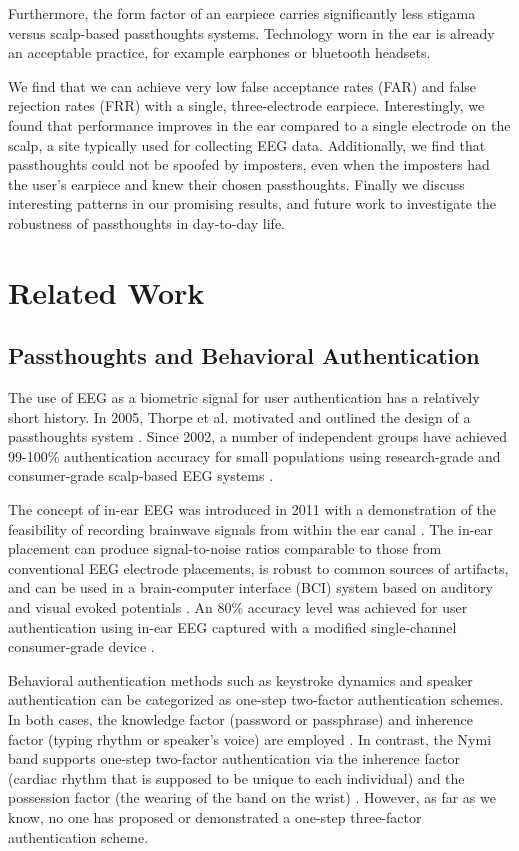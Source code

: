 \documentclass{sigchi}
\begin{document}
Furthermore, the form factor of an earpiece carries significantly less stigama versus scalp-based passthoughts systems. Technology worn in the ear is already an acceptable practice, for example earphones or bluetooth headsets.

We find that we can achieve very low false acceptance rates (FAR) and false rejection rates (FRR) with a single, 
three-electrode earpiece. Interestingly, we found that performance improves in the ear compared to a single electrode on the scalp, a site typically used for collecting EEG data. Additionally, we find that passthoughts could not be spoofed by imposters, even when the imposters had the user's earpiece and knew their chosen passthoughts. Finally we discuss interesting patterns in our promising results, and future work to investigate the robustness of passthoughts in day-to-day life.

\section{Related Work}

\subsection{Passthoughts and Behavioral Authentication}
The use of EEG as a biometric signal for user authentication has a relatively short history.
In 2005, Thorpe et al. motivated and outlined the design of a passthoughts system \cite{Thorpe2005}.
Since 2002, a number of independent groups have achieved 99-100\% authentication accuracy for small populations using research-grade and consumer-grade scalp-based EEG systems \cite{Poulos2002,Marcel2007a,Ashby2011,Chuang2013b}.

The concept of in-ear EEG was introduced in 2011 with a demonstration of the feasibility of recording brainwave signals from within the ear canal \cite{Looney2011}. The in-ear placement can produce signal-to-noise ratios comparable to those from conventional EEG electrode placements, is robust to common sources of artifacts, and can be used in a brain-computer interface (BCI) system based on auditory and visual evoked potentials \cite{Kidmose2013a}. An 80\% accuracy level was achieved for user authentication using in-ear EEG captured with a modified single-channel consumer-grade device \cite{curran2016passthoughts}.

Behavioral authentication methods such as keystroke dynamics and speaker authentication can be categorized as one-step two-factor authentication schemes. In both cases, the knowledge factor (password or passphrase) and inherence factor (typing rhythm or speaker's voice) are employed \cite{Monrose1997}. In contrast, the Nymi band supports one-step two-factor authentication via the inherence factor (cardiac rhythm that is supposed to be unique to each individual) and the possession factor (the wearing of the band on the wrist) \cite{Nymi}. However, as far as we know, no one has proposed or demonstrated a one-step three-factor authentication scheme.
\end{document}

